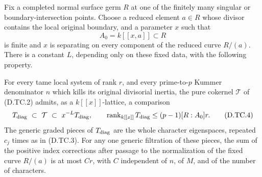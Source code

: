\begin{lemma}
\label{D:tame-boundary-summed-index}
Fix a completed normal surface germ $R$ at one of the finitely many
singular or boundary-intersection points.  Choose a reduced element
$a\in R$ whose divisor contains the local original boundary, and a
parameter $x$ such that
\[
                    A_0=k[[x,a]]\subset R
\]
is finite and $x$ is separating on every component of the reduced
curve $R/(a)$.  There is a constant $L$, depending only on these
fixed data, with the following property.

For every tame local system of rank $r$, and every prime-to-$p$
Kummer denominator $n$ which kills its original divisorial inertia,
the pure cokernel $\mathcal T$ of (D.TC.2) admits, as a
$k[[x]]$-lattice, a comparison
\[
         T_{\rm diag}\ \subset\ \mathcal T\
                      \subset\ x^{-L}T_{\rm diag},
       \qquad
         \operatorname{rank}_{k[[x]]}T_{\rm diag}
                      \le (p-1)[R:A_0]r.               \tag{D.TC.4}
\]
The generic graded pieces of $T_{\rm diag}$ are the whole
character eigenspaces, repeated $c_j$ times as in (D.TC.3).
For any one generic filtration of these pieces, the sum of the
positive index corrections after passage to the normalization
of the fixed curve $R/(a)$ is at most $C r$, with $C$ independent
of $n$, of $M$, and of the number of characters.
\end{lemma}

